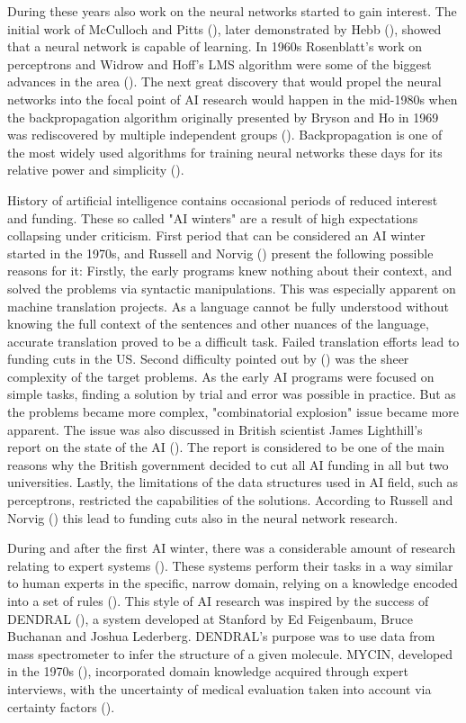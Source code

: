 \documentclass[utf8,english]{gradu3}
\begin{document}
During these years also work on the neural networks started to gain interest. The initial work of McCulloch and Pitts (\cite*{mcculloch1943}), later demonstrated by Hebb (\cite{norvig2002}), showed that a neural network is capable of learning. In 1960s Rosenblatt's work on perceptrons and Widrow and Hoff's LMS algorithm were some of the biggest advances in the area (\cite{widrow1995}). The next great discovery that would propel the neural networks into the focal point of AI research would happen in the mid-1980s when the backpropagation algorithm originally presented by Bryson and Ho in 1969 was rediscovered by multiple independent groups (\cite{norvig2002}). Backpropagation is one of the most widely used algorithms for training neural networks these days for its relative power and simplicity (\cite{rumelhart1995}).

History of artificial intelligence contains occasional periods of reduced interest and funding. These so called "AI winters" are a result of high expectations collapsing under criticism. First period that can be considered an AI winter started in the 1970s, and Russell and Norvig (\cite*{norvig2002}) present the following possible reasons for it: Firstly, the early programs knew nothing about their context, and solved the problems via syntactic manipulations. This was especially apparent on machine translation projects. As a language cannot be fully understood without knowing the full context of the sentences and other nuances of the language, accurate translation proved to be a difficult task. Failed translation efforts lead to funding cuts in the US.
Second difficulty pointed out by (\cite{norvig2002}) was the sheer complexity of the target problems. As the early AI programs were focused on simple tasks, finding a solution by trial and error was possible in practice. But as the problems became more complex, "combinatorial explosion" issue became more apparent. The issue was also discussed in British scientist James Lighthill's report on the state of the AI (\cite*{lighthill1973}). The report is considered to be one of the main reasons why the British government decided to cut all AI funding in all but two universities.
Lastly, the limitations of the data structures used in AI field, such as perceptrons, restricted the capabilities of the solutions. According to Russell and Norvig (\cite*{norvig2002}) this lead to funding cuts also in the neural network research.

During and after the first AI winter, there was a considerable amount of research relating to expert systems (\cite{norvig2002}). These systems perform their tasks in a way similar to human experts in the specific, narrow domain, relying on a knowledge encoded into a set of rules (\cite{myers1986}). This style of AI research was inspired by the success of DENDRAL (\cite{buchanan1968}), a system developed at Stanford by Ed Feigenbaum, Bruce Buchanan and Joshua Lederberg. DENDRAL's purpose was to use data from mass spectrometer to infer the structure of a given molecule. MYCIN, developed in the 1970s (\cite{shortliffe1975}), incorporated domain knowledge acquired through expert interviews, with the uncertainty of medical evaluation taken into account via certainty factors (\cite{norvig2002}).
\end{document}
